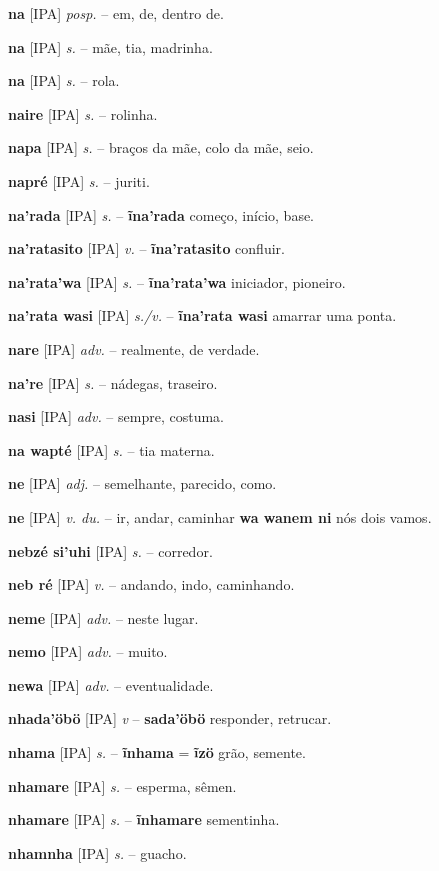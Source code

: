 \textbf{na} [IPA] \textit{posp.} -- em, de, dentro de.

\textbf{na} [IPA] \textit{s.} -- mãe, tia, madrinha.

\textbf{na} [IPA] \textit{s.} -- rola.

\textbf{naire} [IPA] \textit{s.} -- rolinha.

\textbf{napa} [IPA] \textit{s.} -- braços da mãe, colo da mãe, seio.

\textbf{napré} [IPA] \textit{s.} -- juriti.

\textbf{na'rada} [IPA] \textit{s.} -- \textbf{ĩna'rada} começo, início, base.

\textbf{na'ratasito} [IPA] \textit{v.} -- \textbf{ĩna'ratasito} confluir.

\textbf{na'rata'wa} [IPA] \textit{s.} -- \textbf{ĩna'rata'wa} iniciador, pioneiro.

\textbf{na'rata wasi} [IPA] \textit{s./v.} -- \textbf{ĩna'rata wasi} amarrar uma ponta.

\textbf{nare} [IPA] \textit{adv.} -- realmente, de verdade.

\textbf{na're} [IPA] \textit{s.} -- nádegas, traseiro.

\textbf{nasi} [IPA] \textit{adv.} -- sempre, costuma.

\textbf{na wapté} [IPA] \textit{s.} -- tia materna.

\textbf{ne} [IPA] \textit{adj.} -- semelhante, parecido, como.

\textbf{ne} [IPA] \textit{v. du.} -- ir, andar, caminhar  \textbf{wa wanem ni} nós dois vamos.

\textbf{nebzé si'uhi} [IPA] \textit{s.} -- corredor.

\textbf{neb ré} [IPA] \textit{v.} -- andando, indo, caminhando.

\textbf{neme} [IPA] \textit{adv.} -- neste lugar.

\textbf{nemo} [IPA] \textit{adv.} -- muito.

\textbf{newa} [IPA] \textit{adv.} -- eventualidade.

\textbf{nhada'öbö} [IPA] \textit{v} -- \textbf{sada'öbö} responder, retrucar.

\textbf{nhama} [IPA] \textit{s.} -- \textbf{ĩnhama} = \textbf{ĩzö} grão, semente.

\textbf{nhamare} [IPA] \textit{s.} -- esperma, sêmen.

\textbf{nhamare} [IPA] \textit{s.} -- \textbf{ĩnhamare} sementinha.

\textbf{nhamnha} [IPA] \textit{s.} -- guacho.

